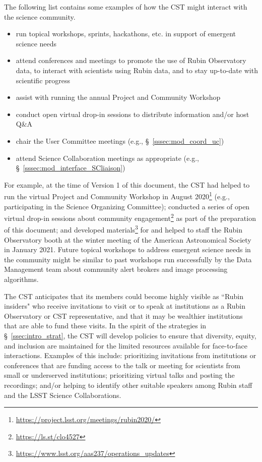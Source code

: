 \documentclass[DM,authoryear,toc]{lsstdoc}
\begin{document}
The following list contains some examples of how the CST might interact with the science community.
\begin{itemize}
\item run topical workshops, sprints, hackathons, etc. in support of emergent science needs
\item attend conferences and meetings to promote the use of Rubin Observatory data, to interact with scientists using Rubin data, and to stay up-to-date with scientific progress
\item assist with running the annual Project and Community Workshop
\item conduct open virtual drop-in sessions to distribute information and/or host Q\&A 
\item chair the User Committee meetings (e.g., \S~\ref{sssec:mod_coord_uc})
\item attend Science Collaboration meetings as appropriate (e.g., \S~\ref{sssec:mod_interface_SCliaison})
\end{itemize}

For example, at the time of Version 1 of this document, the CST had helped to run the virtual Project and Community Workshop in August 2020\footnote{\url{https://project.lsst.org/meetings/rubin2020/}} (e.g., participating in the Science Organizing Committee); conducted a series of open virtual drop-in sessions about community engagement\footnote{\url{https://ls.st/clo4527}} as part of the preparation of this document; and developed materials\footnote{\url{https://www.lsst.org/aas237/operations_updates}} for and helped to staff the Rubin Observatory booth at the winter meeting of the American Astronomical Society in January 2021. 
Future topical workshops to address emergent science needs in the community might be similar to past workshops run successfully by the Data Management team about community alert brokers and image processing algorithms. 

The CST anticipates that its members could become highly visible as ``Rubin insiders" who receive invitations to visit or to speak at institutions as a Rubin Observatory or CST representative, and that it may be wealthier institutions that are able to fund these visits.
In the spirit of the strategies in \S~\ref{ssec:intro_strat}, the CST will develop policies to ensure that diversity, equity, and inclusion are maintained for the limited resources available for face-to-face interactions. 
Examples of this include: prioritizing invitations from institutions or conferences that are funding access to the talk or meeting for scientists from small or underserved institutions; prioritizing virtual talks and posting the recordings; and/or helping to identify other suitable speakers among Rubin staff and the LSST Science Collaborations.
\end{document}
